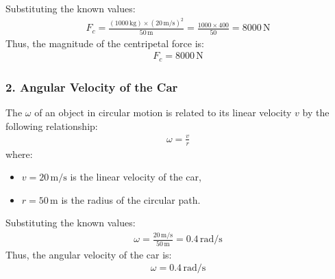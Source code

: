 \documentclass[letterpaper,10pt,english]{jupyterBook}
\begin{document}
\sphinxAtStartPar
Substituting the known values:
\begin{equation*}
\begin{split}
F_c = \frac{(1000 \, \text{kg}) \times (20 \, \text{m/s})^2}{50 \, \text{m}} = \frac{1000 \times 400}{50} = 8000 \, \text{N}
\end{split}
\end{equation*}
\sphinxAtStartPar
Thus, the magnitude of the centripetal force is:
\begin{equation*}
\begin{split}
F_c = 8000 \, \text{N}
\end{split}
\end{equation*}

\subsubsection{2. Angular Velocity of the Car}
\label{\detokenize{prerequisites:angular-velocity-of-the-car}}
\sphinxAtStartPar
The  \( \omega \) of an object in circular motion is related to its linear velocity \(v\) by the following relationship:
\begin{equation*}
\begin{split}
\omega = \frac{v}{r}
\end{split}
\end{equation*}
\sphinxAtStartPar
where:
\begin{itemize}
\item {} 
\sphinxAtStartPar
\(v = 20 \, \text{m/s}\) is the linear velocity of the car,

\item {} 
\sphinxAtStartPar
\(r = 50 \, \text{m}\) is the radius of the circular path.

\end{itemize}

\sphinxAtStartPar
Substituting the known values:
\begin{equation*}
\begin{split}
\omega = \frac{20 \, \text{m/s}}{50 \, \text{m}} = 0.4 \, \text{rad/s}
\end{split}
\end{equation*}
\sphinxAtStartPar
Thus, the angular velocity of the car is:
\begin{equation*}
\begin{split}
\omega = 0.4 \, \text{rad/s}
\end{split}
\end{equation*}
\end{document}

